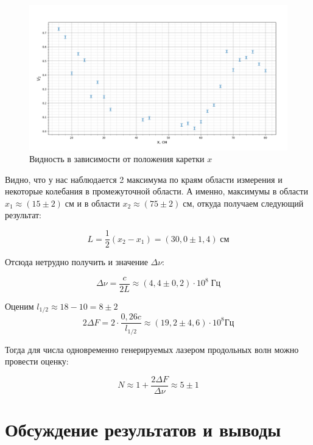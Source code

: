 \documentclass[a4paper,12pt]{article}
\begin{document}
\begin{figure}[H]
	\centering
	\includegraphics[width=0.8\linewidth]{Figure_1}
	\caption{Видность в зависимости от положения каретки  $x$}
	\label{fig:figure1}
\end{figure}

Видно, что у нас наблюдается 2 максимума по краям области измерения и некоторые колебания в промежуточной области. А именно, максимумы в области $ x_1 \approx (15 \pm 2) \; см $ и в области $ x_2 \approx (75 \pm 2) \; см $, откуда получаем следующий результат:

\begin{equation}\label{}
	L = \dfrac{1}{2} (x_2 - x_1) = (30,0 \pm 1,4) \; см
\end{equation}

Отсюда нетрудно получить и значение $ \Delta \nu $:

\begin{equation}\label{}
	\Delta \nu = \frac{c}{2L} \approx (4,4 \pm 0,2) \cdot 10^8 \; Гц
\end{equation}

Оценим $ l_{1/2} \approx 18 - 10 = 8 \pm 2 $
\begin{equation}\label{}
	2 \Delta F = 2 \cdot \frac{0,26 c}{l_{1/2}} \approx (19,2 \pm 4,6) \cdot  10^8 Гц
\end{equation}

Тогда для числа одновременно генерируемых лазером продольных волн можно провести оценку:

\begin{equation}\label{}
	N \approx 1 + \dfrac{ 2\Delta F}{\Delta \nu} \approx 5 \pm 1
\end{equation}




\section{Обсуждение результатов и выводы}
\end{document}
